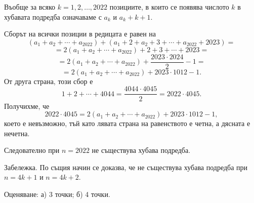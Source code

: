 Въобще за всяко $k=1,2,\ldots,2022$ позициите, в които се появява числото $k$ в хубавата подредба означаваме с $a_k$ и $a_k+k+1$.

Сборът на всички позиции в редицата е равен на
$$
(a_1+a_2+\cdots+a_{2022})+(a_1+2+a_2+3+\cdots+a_{2022}+2023)=
$$
$$
=2(a_1+a_2+\cdots+a_{2022})+2+3+\cdots+2023=
$$
$$
=2(a_1+a_2+\cdots+a_{2022})+\frac{2023\cdot2024}{2}-1=
$$
$$
=2(a_1+a_2+\cdots+a_{2022})+2023\cdot1012-1.
$$
От друга страна, този сбор е
$$
1+2+\cdots+4044=\frac{4044\cdot4045}{2}=2022\cdot4045.
$$
Получихме, че
$$
2022\cdot4045=2(a_1+a_2+\cdots+a_{2022})+2023\cdot1012-1,
$$
което е невъзможно, тъй като лявата страна на равенството е четна, а дясната е нечетна.

Следователно при $n=2022$ не съществува хубава подредба.

Забележка. По същия начин се доказва, че не съществува хубава подредба при $n=4k+1$ и $n=4k+2$.

Оценяване: а) 3 точки; б) 4 точки.